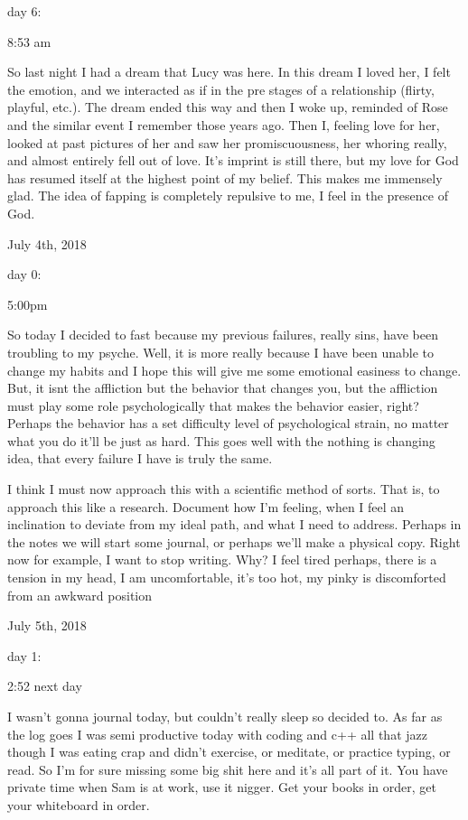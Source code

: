 day 6:

8:53 am

So last night I had a dream that Lucy was here. In this dream I loved
her, I felt the emotion, and we interacted as if in the pre stages of a
relationship (flirty, playful, etc.). The dream ended this way and then
I woke up, reminded of Rose and the similar event I remember those years
ago. Then I, feeling love for her, looked at past pictures of her and
saw her promiscuousness, her whoring really, and almost entirely fell
out of love. It's imprint is still there, but my love for God has
resumed itself at the highest point of my belief. This makes me
immensely glad. The idea of fapping is completely repulsive to me, I
feel in the presence of God.

\bigskip
\bigskip
July 4th, 2018

day 0:

5:00pm

So today I decided to fast because my previous failures, really sins,
have been troubling to my psyche. Well, it is more really because I have
been unable to change my habits and I hope this will give me some
emotional easiness to change. But, it isnt the affliction but the
behavior that changes you, but the affliction must play some role
psychologically that makes the behavior easier, right? Perhaps the
behavior has a set difficulty level of psychological strain, no matter
what you do it'll be just as hard. This goes well with the nothing is
changing idea, that every failure I have is truly the same.

I think I must now approach this with a scientific method of sorts. That
is, to approach this like a research. Document how I'm feeling, when I
feel an inclination to deviate from my ideal path, and what I need to
address. Perhaps in the notes we will start some journal, or perhaps
we'll make a physical copy. Right now for example, I want to stop
writing. Why? I feel tired perhaps, there is a tension in my head, I am
uncomfortable, it's too hot, my pinky is discomforted from an awkward
position

\bigskip
\bigskip
July 5th, 2018

day 1:

2:52 next day

I wasn't gonna journal today, but couldn't really sleep so decided to.
As far as the log goes I was semi productive today with coding and c++
all that jazz though I was eating crap and didn't exercise, or meditate,
or practice typing, or read. So I'm for sure missing some big shit here
and it's all part of it. You have private time when Sam is at work, use
it nigger. Get your books in order, get your whiteboard in order.

